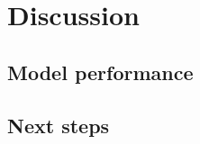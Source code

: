 \documentclass[onecolumn]{article}
\begin{document}
\section{Discussion}

\subsection{Model performance}


\subsection{Next steps}


\begin{multicols}{2}

{\small
}

\end{multicols}
\end{document}
